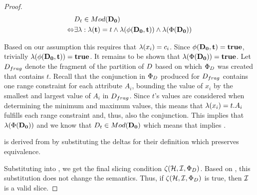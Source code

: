 \begin{proof}
\begin{align*}
  &D_t \in Mod({\mathbf{D_0}})\\
  \Leftrightarrow &\exists \lambda: \lambda(\mathbf{t}) = t \land \lambda(\phi(\mathbf{D_0},\mathbf{t})) \land \lambda(\Phi(\mathbf{D_0}))
\end{align*}

Based on our assumption this requires that $\lambda(x_i) = c_i$. Since $\phi(\mathbf{D_0},\mathbf{t}) = \mathbf{true}$, trivially $\lambda(\phi(\mathbf{D_0},\mathbf{t})) = \mathbf{true}$. It remains to be shown that $\lambda(\Phi(\mathbf{D_0})) = \mathbf{true}$. Let $D_{frag}$ denote the fragment of the partition of $D$ based on which $\Phi_{D}$ was created that contains $t$. Recall that the conjunction in $\Phi_{D}$ produced for $D_{frag}$ contains one range constraint for each attribute $A_i$, bounding the value of $x_i$ by the smallest and largest value of $A_i$ in $D_{frag}$. Since $t$'s values are considered when determining the minimum and maximum values, this means that $\lambda(x_i) = t.A_i$ fulfills each range constraint and, thus, also the conjunction. This implies that $\lambda(\Phi(\mathbf{D_0}))$ and we know that $D_t \in Mod({\mathbf{D_0}})$ which means that  implies .

 is derived from  by substituting the deltas for their definition which preserves equivalence.



Substituting  into , we get the final slicing condition $\zeta({\mathcal{H}},{\mathcal{I}},{\Phi_{D}})$. Based on , this substitution does not change the semantics. Thus, if $\zeta({\mathcal{H}},{\mathcal{I}},{\Phi_{D}})$ is true, then $\mathcal{I}$ is a valid slice.


\end{proof}
